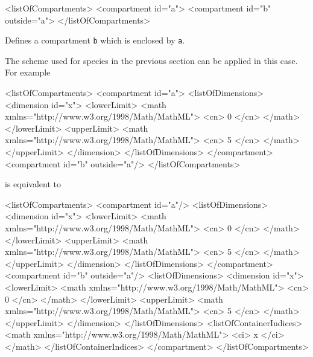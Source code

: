 \documentclass{cekarticle}
\begin{document}
\begin{example}
<listOfCompartments>
    <compartment id="a">
    <compartment id="b" outside="a">
</listOfCompartments>
\end{example}

Defines a compartment \texttt{b} which is enclosed by \texttt{a}.

The scheme used for species in the previous section can be applied in this case.
For example

\begin{example}
<listOfCompartments>
    <compartment id="a">
        <listOfDimensions>
            <dimension id="x">
                <lowerLimit>
                    <math xmlns="http://www.w3.org/1998/Math/MathML">
                        <cn> 0 </cn>
                    </math>
                </lowerLimit>
                <upperLimit>
                    <math xmlns="http://www.w3.org/1998/Math/MathML">
                        <cn> 5 </cn>
                    </math>
                </upperLimit>
            </dimension>
        </listOfDimensions>
    </compartment>
    <compartment id="b" outside="a"/>
</listOfCompartments>
\end{example}

is equivalent to

\begin{example}
<listOfCompartments>
    <compartment id="a"/>
        <listOfDimensions>
            <dimension id="x">
                <lowerLimit>
                    <math xmlns="http://www.w3.org/1998/Math/MathML">
                        <cn> 0 </cn>
                    </math>
                </lowerLimit>
                <upperLimit>
                    <math xmlns="http://www.w3.org/1998/Math/MathML">
                        <cn> 5 </cn>
                    </math>
                </upperLimit>
            </dimension>
        </listOfDimensions>
    </compartment>
    <compartment id="b" outside="a"/>
        <listOfDimensions>
            <dimension id="x">
                <lowerLimit>
                    <math xmlns="http://www.w3.org/1998/Math/MathML">
                        <cn> 0 </cn>
                    </math>
                </lowerLimit>
                <upperLimit>
                    <math xmlns="http://www.w3.org/1998/Math/MathML">
                        <cn> 5 </cn>
                    </math>
                </upperLimit>
            </dimension>
        </listOfDimensions>
        <listOfContainerIndices>
            <math xmlns="http://www.w3.org/1998/Math/MathML">
                <ci> x </ci>
            </math>
        </listOfContainerIndices>
    </compartment>
</listOfCompartments>
\end{example}
\end{document}
